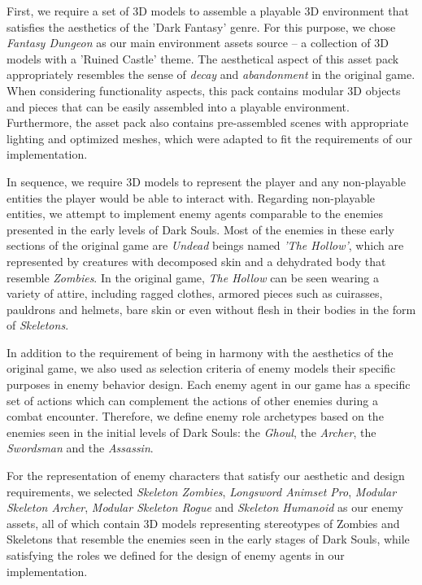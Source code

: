 First, we require a set of 3D models to assemble a playable 3D environment that satisfies the aesthetics of the 'Dark Fantasy' genre. For this purpose, we chose \emph{Fantasy Dungeon} as our main environment assets source -- a collection of 3D models with a 'Ruined Castle' theme. The aesthetical aspect of this asset pack appropriately resembles the sense of \emph{decay} and \emph{abandonment} in the original game. When considering functionality aspects, this pack contains modular 3D objects and pieces that can be easily assembled into a playable environment. Furthermore, the asset pack also contains pre-assembled scenes with appropriate lighting and optimized meshes, which were adapted to fit the requirements of our implementation.




In sequence, we require 3D models to represent the player and any non-playable entities the player would be able to interact with. Regarding non-playable entities, we attempt to implement enemy agents comparable to the enemies presented in the early levels of Dark Souls. Most of the enemies in these early sections of the original game are \emph{Undead} beings named \emph{'The Hollow'}, which are represented by creatures with decomposed skin and a dehydrated body that resemble \emph{Zombies}. In the original game, \emph{The Hollow} can be seen wearing a variety of attire, including ragged clothes, armored pieces such as cuirasses, pauldrons and helmets, bare skin or even without flesh in their bodies in the form of \emph{Skeletons}.

In addition to the requirement of being in harmony with the aesthetics of the original game, we also used as selection criteria of enemy models their specific purposes in enemy behavior design. Each enemy agent in our game has a specific set of actions which can complement the actions of other enemies during a combat encounter. Therefore, we define enemy role archetypes based on the enemies seen in the initial levels of Dark Souls: the \emph{Ghoul}, the \emph{Archer}, the \emph{Swordsman} and the \emph{Assassin}.

For the representation of enemy characters that satisfy our aesthetic and design requirements, we selected \emph{Skeleton Zombies}, \emph{Longsword Animset Pro}, \emph{Modular Skeleton Archer}, \emph{Modular Skeleton Rogue} and \emph{Skeleton Humanoid} as our enemy assets, all of which contain 3D models representing stereotypes of Zombies and Skeletons that resemble the enemies seen in the early stages of Dark Souls, while satisfying the roles we defined for the design of enemy agents in our implementation.

